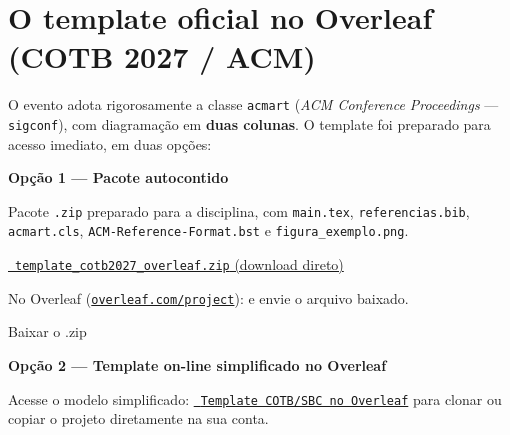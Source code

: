     \section{O template oficial no Overleaf (COTB 2027 / ACM)}\label{sec:template}

    O evento adota rigorosamente a classe \texttt{acmart} (\textit{ACM Conference Proceedings} --- \texttt{sigconf}), com diagramação em \textbf{duas colunas}. O template foi preparado para acesso imediato, em duas opções:

    \begin{tcolorbox}[enhanced, colback=verdeVivo!5, colframe=verdeVivo!40, boxrule=0.8pt, arc=8pt, left=12pt, right=12pt, top=10pt, bottom=10pt, fontupper=\small\raggedright, sidebyside, lefthand ratio=0.8, sidebyside gap=14pt, segmentation hidden]
        {\color{verde}\bfseries\faFileArchive\hspace{0.5em}Opção 1 --- Pacote autocontido}\hspace{0.6em}\par\vspace{4pt}
        Pacote \texttt{.zip} preparado para a disciplina, com \texttt{main.tex}, \texttt{referencias.bib}, \texttt{acmart.cls}, \texttt{ACM-Reference-Format.bst} e \texttt{figura\_exemplo.png}.\par\vspace{4pt}
        \href{\urlZip}{\faDownload\ \texttt{template\_cotb2027\_overleaf.zip} (download direto)}\par\vspace{4pt}
        No Overleaf (\href{https://www.overleaf.com/project}{\texttt{overleaf.com/project}}): \seta{} e envie o arquivo baixado.
        \tcblower
        \centering
        \qrcode[height=2.1cm]{\urlZip}\par\vspace{3pt}
        {\scriptsize\color{suave}Baixar o .zip}
    \end{tcolorbox}

    \begin{tcolorbox}[enhanced, colback=fundo, colframe=borda, boxrule=0.8pt, arc=8pt, left=12pt, right=12pt, top=10pt, bottom=10pt, fontupper=\small\raggedright]
        {\color{azul}\bfseries\faGlobeAmericas\hspace{0.5em}Opção 2 --- Template on-line simplificado no Overleaf}\par\vspace{4pt}
        Acesse o modelo simplificado: \href{\urlTemplateACM}{\faExternalLink*\ \texttt{Template COTB/SBC no Overleaf}} para clonar ou copiar o projeto diretamente na sua conta.
    \end{tcolorbox}

